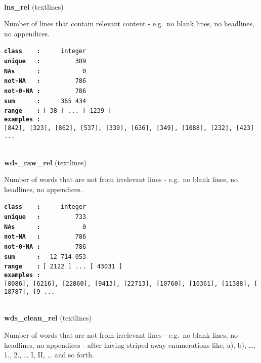 \documentclass[]{article}
\begin{document}
~

\textbf{lns\_rel} (textlines)

Number of lines that contain relevant content - e.g.~no blank lines, no
headlines, no appendices.

\textbf{\texttt{class\ \ \ \ :}} \texttt{~~~~~integer}\\
\textbf{\texttt{unique\ \ \ :}} \texttt{~~~~~~~~~389}\\
\textbf{\texttt{NAs\ \ \ \ \ \ :}} \texttt{~~~~~~~~~~~0}\\
\textbf{\texttt{not-NA\ \ \ :}} \texttt{~~~~~~~~~786}\\
\textbf{\texttt{not-0-NA\ :}} \texttt{~~~~~~~~~786}\\
\textbf{\texttt{sum\ \ \ \ \ \ :}} \texttt{~~~~~365~434}\\
\textbf{\texttt{range\ \ \ \ :}}
\texttt{{[}\ 38\ {]}\ ...\ {[}\ 1239\ {]}}\\
\textbf{\texttt{examples\ :}}
\texttt{{[}842{]},\ {[}323{]},\ {[}862{]},\ {[}537{]},\ {[}339{]},\ {[}636{]},\ {[}349{]},\ {[}1088{]},\ {[}232{]},\ {[}423{]}\ ...}\\

~

\textbf{wds\_raw\_rel} (textlines)

Number of words that are not from irrelevant lines - e.g.~no blank
lines, no headlines, no appendices.

\textbf{\texttt{class\ \ \ \ :}} \texttt{~~~~~integer}\\
\textbf{\texttt{unique\ \ \ :}} \texttt{~~~~~~~~~733}\\
\textbf{\texttt{NAs\ \ \ \ \ \ :}} \texttt{~~~~~~~~~~~0}\\
\textbf{\texttt{not-NA\ \ \ :}} \texttt{~~~~~~~~~786}\\
\textbf{\texttt{not-0-NA\ :}} \texttt{~~~~~~~~~786}\\
\textbf{\texttt{sum\ \ \ \ \ \ :}} \texttt{~~12~714~053}\\
\textbf{\texttt{range\ \ \ \ :}}
\texttt{{[}\ 2122\ {]}\ ...\ {[}\ 43031\ {]}}\\
\textbf{\texttt{examples\ :}}
\texttt{{[}8086{]},\ {[}6216{]},\ {[}22860{]},\ {[}9413{]},\ {[}22713{]},\ {[}10760{]},\ {[}10361{]},\ {[}11388{]},\ {[}18787{]},\ {[}9\ ...}\\

~

\textbf{wds\_clean\_rel} (textlines)

Number of words that are not from irrelevant lines - e.g.~no blank
lines, no headlines, no appendices - after having striped away
enumerations like, a), b), \ldots{}, 1., 2., \ldots{} I, II, \ldots{}
and so forth.
\end{document}
